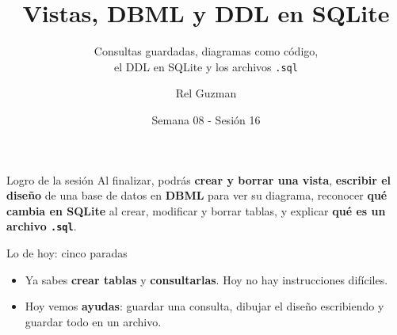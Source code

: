 \documentclass[aspectratio=169,10pt,c]{beamer}
\title{Vistas, DBML y DDL en SQLite}
\subtitle{Consultas guardadas, diagramas como código,\\ el DDL en SQLite y los archivos \texttt{.sql}}
\date{Semana 08 - Sesión 16}
\author{Rel Guzman}
\begin{document}
{\maketitle}

\begin{frame}[c]
\begin{block}{Logro de la sesión}
Al finalizar, podrás \textbf{crear y borrar una vista}, \textbf{escribir el diseño} de una base de datos en \textbf{DBML} para ver su diagrama, reconocer \textbf{qué cambia en SQLite} al crear, modificar y borrar tablas, y explicar \textbf{qué es un archivo \texttt{.sql}}.
\end{block}
\end{frame}
\begin{frame}{Lo de hoy: cinco paradas}
\begin{center}
\end{center}
\vspace{0.5cm}
\begin{itemize}\setlength\itemsep{8pt}
  \item Ya sabes \textbf{crear tablas} y \textbf{consultarlas}. Hoy no hay instrucciones difíciles.
  \item Hoy vemos \textbf{ayudas}: guardar una consulta, dibujar el diseño escribiendo y guardar todo en un archivo.
\end{itemize}
\vspace{0.4cm}
\end{frame}
\end{document}
